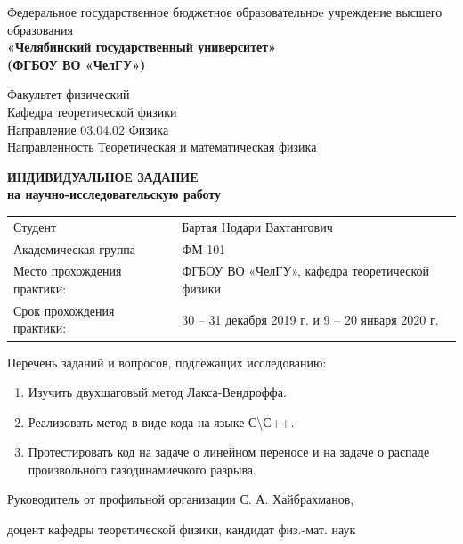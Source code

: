 \documentclass[a4paper]{article}
\begin{document}
\begin{titlepage}
	\singlespacing
	\begin{center}
		Федеральное государственное бюджетное образовательноe учреждение высшего образования \\
		\textbf{«Челябинский государственный университет» \\ (ФГБОУ ВО «ЧелГУ»)}
	\end{center}
	\begin{center}
		Факультет физический			\\
		Кафедра теоретической физики	\\
		Направление 03.04.02 Физика		\\
		Направленность Теоретическая и математическая физика
	\end{center}
	\vfill
	\begin{center}
		\textbf{ИНДИВИДУАЛЬНОЕ ЗАДАНИЕ\\на научно-исследовательскую работу}
	\end{center}
	\begin{center}
		\begin{tabular}{p{} p{}}
			Студент					&	Бартая Нодари Вахтангович	\\
			Академическая группа	&	ФМ-101						\\
			Место прохождения \hfill \newline
			практики:	&	ФГБОУ ВО «ЧелГУ», кафедра теоретической физики						\\
			Срок прохождения \newline практики: & 30 – 31 декабря 2019 г. и 9 – 20 января 2020 г.
		\end{tabular}
	\end{center}
\vfill
\raggedright Перечень заданий и вопросов, подлежащих исследованию:
\begin{enumerate}
	\item Изучить двухшаговый метод Лакса-Вендроффа.
	\item Реализовать метод в виде кода на языке С\textbackslash С++.
	\item Протестировать код на задаче о линейном переносе и на задаче о распаде произвольного газодинамиечкого разрыва.
\end{enumerate}
	\vfill
	\onehalfspacing
	Руководитель от профильной организации \enspace\hrulefill \hspace{0.2cm} С. А. Хайбрахманов,
	
	доцент кафедры теоретической физики, кандидат физ.-мат. наук \vspace{3pt}
	

\end{titlepage}
\end{document}
